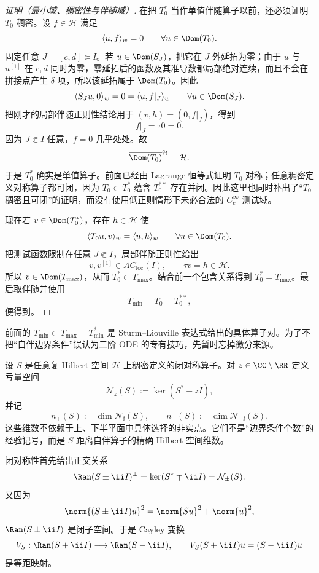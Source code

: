 \begin{proof}[证明（最小域、稠密性与伴随域）]
在把 $T_0^*$ 当作单值伴随算子以前，还必须证明 $T_0$ 稠密。设
$f\in\mathcal H$ 满足
\[
 \langle u,f\rangle_w=0
 \qquad\forall u\in\Dom(T_0).
\]
固定任意 $J=[c,d]\Subset I$。若 $u\in\Dom(S_J)$，把它在 $J$ 外延拓为零；由于 $u$ 与 $u^{[1]}$ 在 $c,d$ 同时为零，零延拓后的函数及其准导数都局部绝对连续，而且不会在拼接点产生 $\delta$ 项，所以该延拓属于 $\Dom(T_0)$。因此
\[
 \langle S_Ju,0\rangle_w
 =0
 =\langle u,f|_J\rangle_w
 \qquad\forall u\in\Dom(S_J).
\]
把刚才的局部伴随正则性结论用于 $(v,h)=(0,f|_J)$，得到
\[
 f|_J=\tau0=0.
\]
因为 $J\Subset I$ 任意，$f=0$ 几乎处处。故
\begin{equation*}\overline{\Dom(T_0)}^{\mathcal H}=\mathcal H.
\end{equation*}
于是 $T_0^*$ 确实是单值算子。前面已经由 Lagrange 恒等式证明 $T_0$ 对称；任意稠密定义对称算子都可闭，因为
$T_0\subset T_0^*$ 蕴含 $T_0^{**}$ 存在并闭。因此这里也同时补出了“$T_0$ 稠密且可闭”的证明，而没有使用低正则情形下未必合法的 $C_c^\infty$ 测试域。

现在若 $v\in\Dom(T_0^*)$，存在 $h\in\mathcal H$ 使
\[
 \langle T_0u,v\rangle_w=\langle u,h\rangle_w
 \qquad \forall u\in\Dom(T_0).
\]
把测试函数限制在任意 $J\Subset I$，局部伴随正则性给出
\[
 v,v^{[1]}\in AC_{\mathrm{loc}}(I),
 \qquad
 \tau v=h\in\mathcal H.
\]
所以 $v\in\Dom(T_{\max})$，从而 $T_0^*\subset T_{\max}$。结合前一个包含关系得到 $T_0^*=T_{\max}$。最后取伴随并使用
\[
 T_{\min}=\overline{T_0}=T_0^{**},
\]
便得到。
\end{proof}

前面的 $T_{\min}\subset T_{\max}=T_{\min}^*$ 是 Sturm--Liouville 表达式给出的具体算子对。为了不把“自伴边界条件”误认为二阶 ODE 的专有技巧，先暂时忘掉微分来源。

\begin{definition}[亏量空间与亏指数]
设 $S$ 是任意复 Hilbert 空间 $\mathcal H$ 上稠密定义的闭对称算子。对 $z\in\CC\setminus\RR$ 定义 亏量空间
\[
 \mathcal N_z(S):=\ker(S^*-zI),
\]
并记
\[
 n_+(S):=\dim\mathcal N_{\ii}(S),\qquad
 n_-(S):=\dim\mathcal N_{-\ii}(S).
\]
这些维数不依赖于上、下半平面中具体选择的非实点。它们不是“边界条件个数”的经验记号，而是 $S$ 距离自伴算子的精确 Hilbert 空间维数。
\end{definition}

\begin{proposition}
闭对称性首先给出正交关系
\[
 \Ran(S\pm\ii I)^\perp=\ker(S^*\mp\ii I)=\mathcal N_{\pm}(S).
\]
又因为
\[
 \norm{(S\pm\ii I)u}^2
 =\norm{Su}^2+\norm{u}^2,
\]
$\Ran(S\pm\ii I)$ 是闭子空间。于是 Cayley 变换
\begin{equation}\label{eq:math-sl-cayley-symmetric}
 V_S:\Ran(S+\ii I)\longrightarrow\Ran(S-\ii I),
 \qquad
 V_S(S+\ii I)u=(S-\ii I)u
\end{equation}
是等距映射。
\end{proposition}

